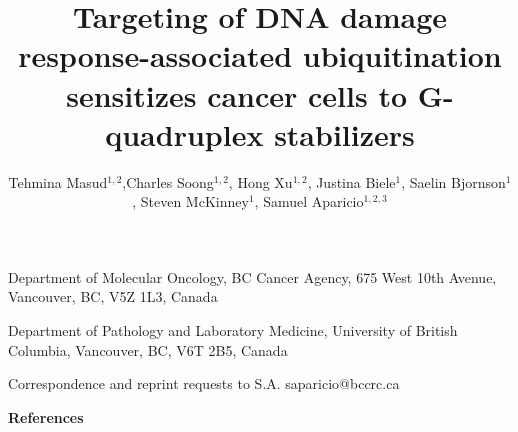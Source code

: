 \documentclass{nature}
\title{\textsf{\textbf{Targeting of DNA damage response-associated ubiquitination sensitizes cancer cells to G-quadruplex stabilizers}}}
\author{Tehmina Masud$^{1,2}$,Charles Soong$^{1,2}$, Hong Xu$^{1,2}$, Justina Biele$^{1}$, Saelin Bjornson$^{1}$, Steven McKinney$^{1}$, Samuel Aparicio$^{1,2,3}$}
\begin{document}
\maketitle
\begin{affiliations}
\item Department of Molecular Oncology, BC Cancer Agency, 675 West 10th Avenue, Vancouver, BC, V5Z 1L3, Canada
\item Department of Pathology and Laboratory Medicine, University of British Columbia, Vancouver, BC, V6T 2B5, Canada
\item Correspondence and reprint requests to S.A. saparicio@bccrc.ca
\end{affiliations}


\newpage
\begin{abstract}
    
\end{abstract}

\newpage


\begin{results}
    
\end{results}

\newpage


\newpage


\newpage


\newpage
\begin{methods}

\end{methods}

\newpage
\textbf{References}





\end{document}

